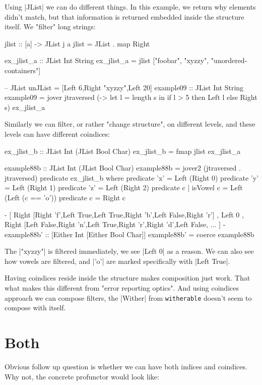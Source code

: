 Using |JList| we can do different things.
In this example, we return why elements didn't match,
but that information is returned embedded inside the structure itself.
We "filter" long strings:

\begin{code}
jlist :: [a] -> JList j a
jlist = JList . map Right

ex_jlist_a :: JList Int String
ex_jlist_a = jlist ["foobar", "xyzzy", "unordered-containers"]

-- JList {unJList = [Left 6,Right "xyzzy",Left 20]}
example09 :: JList Int String
example09 = jover jtraversed
    (\s -> let l = length s in if l > 5 then Left l else Right s)
    ex_jlist_a
\end{code}

Similarly we can filter, or rather "change structure", on different levels,
and these levels can have different coindices:

\begin{code}
ex_jlist_b :: JList Int (JList Bool Char)
ex_jlist_b = fmap jlist ex_jlist_a

example88b :: JList Int (JList Bool Char)
example88b = jover2
    (jtraversed . jtraversed)
    predicate
    ex_jlist_b
  where
    predicate 'x'           = Left (Right 0)
    predicate 'y'           = Left (Right 1)
    predicate 'z'           = Left (Right 2)
    predicate c | isVowel c = Left (Left (c == 'o'))
    predicate c             = Right c

{-
[ Right [Right 'f',Left True,Left True,Right 'b',Left False,Right 'r']
, Left 0
, Right [Left False,Right 'n',Left True,Right 'r',Right 'd',Left False, ...
]
-}
example88b' :: [Either Int [Either Bool Char]]
example88b' = coerce example88b
\end{code}

The |"xyzzy"| is filtered immediately, we see |Left 0| as a reason.
We can also see how vowels are filtered, and |'o'| are marked specifically
with |Left True|.

Having coindices reside inside the structure makes composition just work.
That what makes this different from "error reporting optics".
And using coindices approach we can compose filters,
the |Wither| from \texttt{witherable} doesn't seem to compose
with itself.

\section{Both}

Obvious follow up question is whether we can have both indices and coindices.
Why not, the concrete profunctor would look like:

